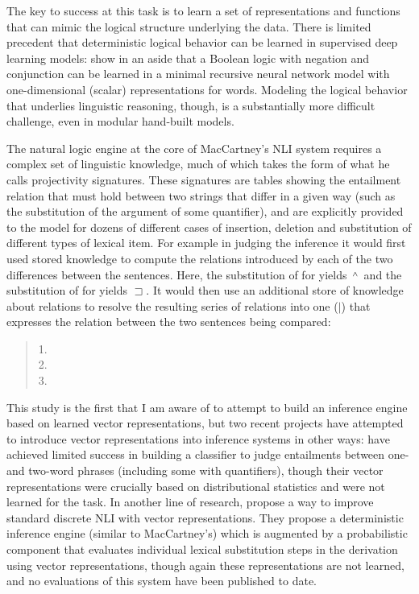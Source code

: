 The key to success at this task is to learn a set of representations and functions that can mimic the logical structure underlying the data. There is limited precedent that deterministic logical behavior can be learned in supervised deep learning models: \citet{socher2012semantic} show in an aside that a Boolean logic with negation and conjunction can be learned in a minimal recursive neural network model with one-dimensional (scalar) representations for words. Modeling the logical behavior that underlies linguistic reasoning, though, is a substantially more difficult challenge, even in modular hand-built models.

The natural logic engine at the core of MacCartney's \cite{maccartney2009natural} NLI system requires a complex set of linguistic knowledge, much of which takes the form of what he calls projectivity signatures. These signatures are tables showing the entailment relation that must hold between two strings that differ in a given way (such as the substitution of the argument of some quantifier), and are explicitly provided to the model
for dozens of different cases of insertion, deletion and substitution of different types of lexical item. For example in judging the inference  it would first used stored knowledge to compute the relations introduced by each of the two differences between the sentences. Here, the substitution of  for   yields $\natneg$ and the substitution of  for  yields $\sqsupset$. It would then use an additional store of knowledge about relations to resolve the resulting series of relations into one ($|$) that expresses the relation between the two sentences being compared:
\begin{quote}

1. \\
2. \\
3. 

\end{quote}

This study is the first that I am aware of to attempt to build an inference engine based on learned vector representations, but two recent projects have attempted to introduce vector representations into inference systems in other ways: 
\citet{baroni2012entailment} have achieved limited success in building a classifier to judge entailments between one- and two-word phrases (including some with quantifiers), though their vector representations were crucially based on distributional statistics and were not  learned for the task.
In another line of research, \citet{garrette2013formal} propose a way to improve standard discrete NLI with vector representations. They propose a deterministic inference engine (similar to MacCartney's) which is augmented by a probabilistic component that evaluates individual lexical substitution steps in the derivation using vector representations, though again these representations are not learned, and no evaluations of this system have been published to date.
\label{sec2}

